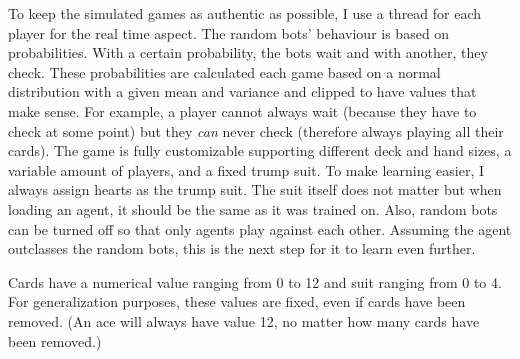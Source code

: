 \documentclass[a4paper,titlepage]{article}
\begin{document}
To keep the simulated games as authentic as possible, I use a thread for each player for the real time aspect. The random bots' behaviour is based on probabilities. With a certain probability, the bots wait and with another, they check. These probabilities are calculated each game based on a normal distribution with a given mean and variance and clipped to have values that make sense. For example, a player cannot always wait (because they have to check at some point) but they \emph{can} never check (therefore always playing all their cards). The game is fully customizable supporting different deck and hand sizes, a variable amount of players, and a fixed trump suit. To make learning easier, I always assign hearts as the trump suit. The suit itself does not matter but when loading an agent, it should be the same as it was trained on. Also, random bots can be turned off so that only agents play against each other. Assuming the agent outclasses the random bots, this is the next step for it to learn even further.

Cards have a numerical value ranging from 0 to 12 and suit ranging from 0 to 4. For generalization purposes, these values are fixed, even if cards have been removed. (An ace will always have value 12, no matter how many cards have been removed.) \medskip
\end{document}

